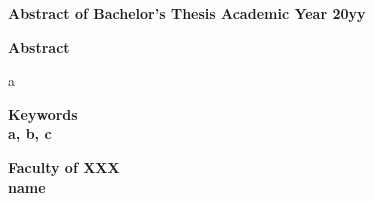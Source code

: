 \begin{center}
  \textbf{\large Abstract of Bachelor's Thesis Academic Year 20yy}
  
  \vspace{6mm}
  
  \textbf{\large }
\end{center}

\begin{flushleft}
  \textbf{Abstract}\\
\end{flushleft}

\vspace{10mm}
a

\begin{flushleft}
  \textbf{Keywords}\\
  \textbf{a, b, c}
  
\end{flushleft}

\begin{flushright}
  \textbf{Faculty of XXX}\\
  \textbf{name}\\
\end{flushright}
\newpage
